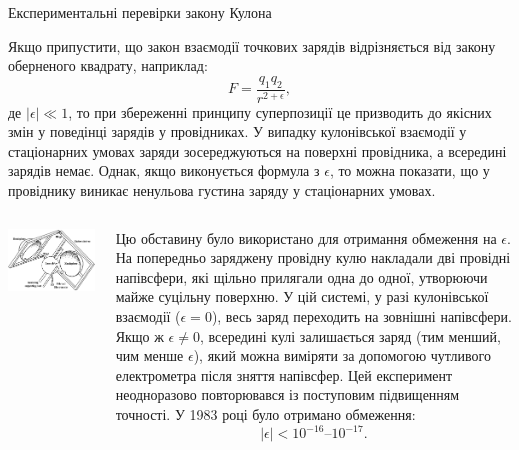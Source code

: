 \documentclass{beamer}
\begin{document}
\begin{frame}{Експериментальні перевірки закону Кулона}{}\small
\begin{block}{}\justifying
Якщо припустити, що закон взаємодії точкових зарядів відрізняється від закону оберненого квадрату, наприклад:
\begin{equation*}
F = \frac{q_1 q_2}{r^{2 + \epsilon}},
\end{equation*}
де $|\epsilon| \ll 1$, то при збереженні принципу суперпозиції це призводить до якісних змін у поведінці зарядів у
провідниках. У випадку кулонівської взаємодії у стаціонарних умовах заряди зосереджуються на поверхні провідника, а всередині зарядів немає.
Однак, якщо виконується формула з $\epsilon$, то можна показати, що у провіднику виникає ненульова густина заряду у стаціонарних умовах.
\end{block}
\begin{columns}
	\begin{column}{0.4\linewidth}
         \includegraphics[width=\linewidth]{cavindesh_exp}
	\end{column}
	\begin{column}{0.6\linewidth}
 \begin{block}{}\justifying\footnotesize
    Цю обставину було використано для отримання обмеження на $\epsilon$. На попередньо заряджену провідну кулю накладали дві провідні напівсфери, які
щільно прилягали одна до одної, утворюючи майже суцільну поверхню. У цій системі, у разі кулонівської взаємодії ($\epsilon = 0$), весь заряд
переходить на зовнішні напівсфери. Якщо ж $\epsilon \neq 0$, всередині кулі залишається заряд (тим менший, чим менше $\epsilon$), який можна
виміряти за допомогою чутливого електрометра після зняття напівсфер. Цей експеримент неодноразово повторювався із поступовим підвищенням точності. У
1983 році було отримано обмеження:
\begin{equation*}
|\epsilon| < 10^{-16} \text{–} 10^{-17}.
\end{equation*}
\end{block}
	\end{column}
\end{columns}

\end{frame}
\end{document}
